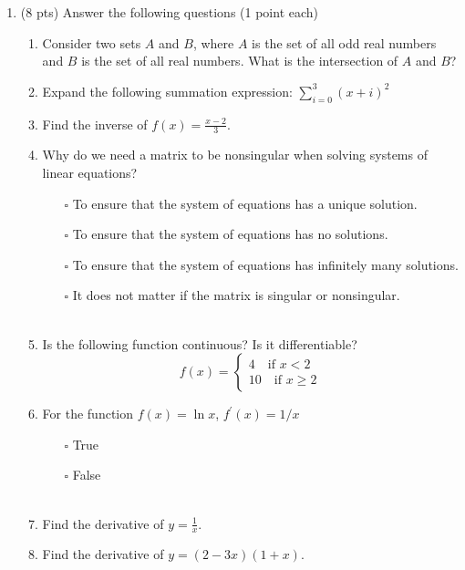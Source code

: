 \documentclass{./../../../Latex/tests}
\begin{document}
\thispagestyle{plain}
\vspace{0.5em}

\begin{enumerate}	

\item (8 pts) Answer the following questions (1 point each)
\begin{enumerate}
\item Consider two sets $A$ and $B$, where $A$ is the set of all odd real numbers and $B$ is the set of all real numbers. What is the intersection of $A$ and $B$? 
\vspace{3cm}
\item Expand the following summation expression: $\sum_{i=0}^{3}(x+i)^{2}$
 \vspace{3cm}
\item Find the inverse of $f(x) = \frac{x-2}{3}$.
\vspace{3cm}
\item Why do we need a matrix to be nonsingular when solving systems of linear equations?
\begin{itemize}
\item[$\square$] To ensure that the system of equations has a unique solution.
\item[$\square$] To ensure that the system of equations has no solutions.
\item[$\square$] To ensure that the system of equations has infinitely many solutions.
\item[$\square$] It does not matter if the matrix is singular or nonsingular.  \\~\\
 \end{itemize}
\item Is the following function continuous? Is it differentiable?
$$ f(x) = \begin{cases}
	4 \quad \text{if } x<2 \\
	10 \quad \text{if } x\geq2
\end{cases} $$
 \vspace{2cm}
\item For the function $f(x) = \ln x$, $f^{\prime} (x)=1/x$ 
  \begin{itemize}
  	\item[$\square$] True 
  	\item[$\square$] False \\~\\
  \end{itemize}  
  \item Find the derivative of $y = \frac{1}{x}$.
   \vspace{3cm}
  \item Find the derivative of $y = (2-3x)(1+x)$.
  \vspace{3cm}
\end{enumerate}


\end{enumerate}
\end{document}
